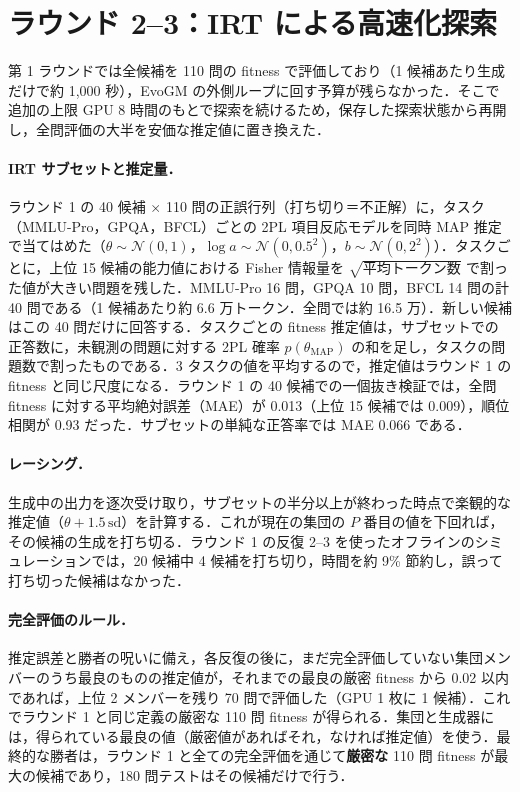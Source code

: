 \section{ラウンド 2--3：IRT による高速化探索}\label{sec:r2}
第 1 ラウンドでは全候補を 110 問の fitness で評価しており（1 候補あたり生成だけで約 1,000 秒），EvoGM の外側ループに回す予算が残らなかった．そこで追加の上限 GPU 8 時間のもとで探索を続けるため，保存した探索状態から再開し，全問評価の大半を安価な推定値に置き換えた．

\paragraph{IRT サブセットと推定量．}ラウンド 1 の 40 候補 $\times$ 110 問の正誤行列（打ち切り＝不正解）に，タスク（MMLU-Pro，GPQA，BFCL）ごとの 2PL 項目反応モデルを同時 MAP 推定で当てはめた（$\theta\sim\mathcal N(0,1)$，$\log a\sim\mathcal N(0,0.5^2)$，$b\sim\mathcal N(0,2^2)$）．タスクごとに，上位 15 候補の能力値における Fisher 情報量を $\sqrt{\text{平均トークン数}}$ で割った値が大きい問題を残した．MMLU-Pro 16 問，GPQA 10 問，BFCL 14 問の計 40 問である（1 候補あたり約 6.6 万トークン．全問では約 16.5 万）．新しい候補はこの 40 問だけに回答する．タスクごとの fitness 推定値は，サブセットでの正答数に，未観測の問題に対する 2PL 確率 $p(\theta_{\text{MAP}})$ の和を足し，タスクの問題数で割ったものである．3 タスクの値を平均するので，推定値はラウンド 1 の fitness と同じ尺度になる．ラウンド 1 の 40 候補での一個抜き検証では，全問 fitness に対する平均絶対誤差（MAE）が 0.013（上位 15 候補では 0.009），順位相関が 0.93 だった．サブセットの単純な正答率では MAE 0.066 である．

\paragraph{レーシング．}生成中の出力を逐次受け取り，サブセットの半分以上が終わった時点で楽観的な推定値（$\theta+1.5\,\text{sd}$）を計算する．これが現在の集団の $P$ 番目の値を下回れば，その候補の生成を打ち切る．ラウンド 1 の反復 2--3 を使ったオフラインのシミュレーションでは，20 候補中 4 候補を打ち切り，時間を約 9\% 節約し，誤って打ち切った候補はなかった．

\paragraph{完全評価のルール．}推定誤差と勝者の呪いに備え，各反復の後に，まだ完全評価していない集団メンバーのうち最良のものの推定値が，それまでの最良の厳密 fitness から 0.02 以内であれば，上位 2 メンバーを残り 70 問で評価した（GPU 1 枚に 1 候補）．これでラウンド 1 と同じ定義の厳密な 110 問 fitness が得られる．集団と生成器には，得られている最良の値（厳密値があればそれ，なければ推定値）を使う．最終的な勝者は，ラウンド 1 と全ての完全評価を通じて\textbf{厳密な} 110 問 fitness が最大の候補であり，180 問テストはその候補だけで行う．


